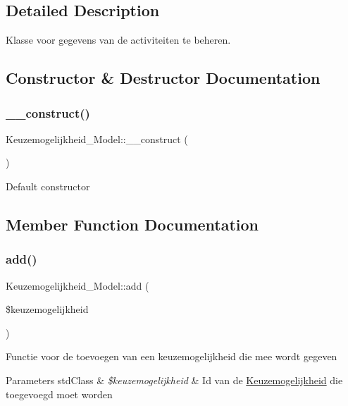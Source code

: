 \subsection{Detailed Description}
Klasse voor gegevens van de activiteiten te beheren. 

\subsection{Constructor \& Destructor Documentation}
\mbox{\label{class_keuzemogelijkheid___model_af2af463bdcd6443ce1a30dade7d100c2}} 
\subsubsection{\texorpdfstring{\+\_\+\+\_\+construct()}{\_\_construct()}}
{\footnotesize\ttfamily Keuzemogelijkheid\+\_\+\+Model\+::\+\_\+\+\_\+construct (\begin{DoxyParamCaption}{ }\end{DoxyParamCaption})}

Default constructor 

\subsection{Member Function Documentation}
\mbox{\label{class_keuzemogelijkheid___model_a420eeb2819baee7810c6f75adc37bccd}} 
\subsubsection{\texorpdfstring{add()}{add()}}
{\footnotesize\ttfamily Keuzemogelijkheid\+\_\+\+Model\+::add (\begin{DoxyParamCaption}\item[{}]{\$keuzemogelijkheid }\end{DoxyParamCaption})}

Functie voor de toevoegen van een keuzemogelijkheid die mee wordt gegeven 
\begin{DoxyParams}[1]{Parameters}
std\+Class & {\em \$keuzemogelijkheid} & Id van de \mbox{\hyperlink{class_keuzemogelijkheid}{Keuzemogelijkheid}} die toegevoegd moet worden \\
\hline
\end{DoxyParams}
\mbox{\label{class_keuzemogelijkheid___model_a85892ff217264f748b19a7da2797a9c7}} 

